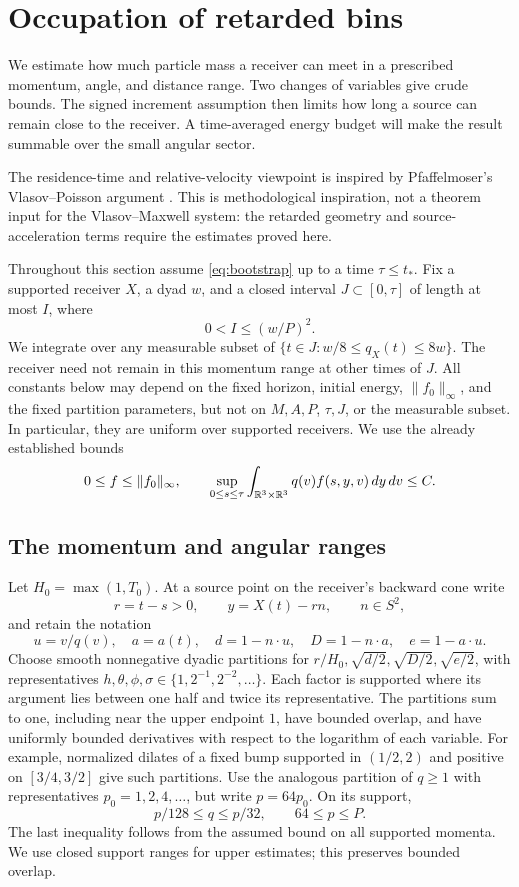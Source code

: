 \section{Occupation of retarded bins}\label{occ:section}

We estimate how much particle mass a receiver can meet in a prescribed
momentum, angle, and distance range. Two changes of variables give crude
bounds. The signed increment assumption then limits how long a source can
remain close to the receiver. A time-averaged energy budget will make the
result summable over the small angular sector.

The residence-time and relative-velocity viewpoint is inspired by
Pfaffelmoser's Vlasov--Poisson argument \cite{Pfaffelmoser1992}.
This is methodological inspiration, not a theorem input for the
Vlasov--Maxwell system: the retarded geometry and source-acceleration
terms require the estimates proved here.

Throughout this section assume \eqref{eq:bootstrap} up to a time
$\tau\leq t_*$. Fix a supported receiver $X$, a dyad $w$, and a closed
interval $J\subset[0,\tau]$ of length at most $I$, where
\begin{equation}\label{occ:interval}
 0<I\leq(w/P)^2.
\end{equation}
We integrate over any measurable subset of
$\{t\in J:w/8\leq q_X(t)\leq8w\}$. The receiver need not remain in
this momentum range at other times of $J$.
All constants below may depend on the fixed horizon, initial energy,
$\|f_0\|_\infty$, and the fixed partition parameters, but not on $M,A,P$,
$\tau,J$, or the measurable subset. In particular, they are uniform over
supported receivers. We use the already established bounds
\[
 0\leq f\leq\|f_0\|_\infty,
 \qquad \sup_{0\leq s\leq\tau}
  \int_{\mathbb R^3\times\mathbb R^3}q(v)f(s,y,v)\,dy\,dv\leq C.
\]

\subsection{The momentum and angular ranges}

Let $H_0=\max(1,T_0)$. At a source point on the receiver's backward cone
write
\[
 r=t-s>0,\qquad y=X(t)-rn,\qquad n\in S^2,
\]
and retain the notation
\[
 u=v/q(v),\quad a=a(t),\quad
 d=1-n\cdot u,\quad D=1-n\cdot a,\quad e=1-a\cdot u.
\]
Choose smooth nonnegative dyadic partitions for
$r/H_0,\sqrt{d/2},\sqrt{D/2},\sqrt{e/2}$, with representatives
$h,\theta,\phi,\sigma\in\{1,2^{-1},2^{-2},\ldots\}$.
Each factor is supported where its argument lies between one half and
twice its representative. The partitions sum to one, including near the
upper endpoint $1$, have bounded overlap, and have uniformly bounded derivatives
with respect to the logarithm of each variable. For example, normalized dilates of a fixed bump
supported in $(1/2,2)$ and positive on $[3/4,3/2]$ give such partitions.
Use the analogous partition of $q\geq1$ with representatives
$p_0=1,2,4,\ldots$, but write $p=64p_0$.
On its support,
\[
 p/128\leq q\leq p/32,\qquad 64\leq p\leq P.
\]
The last inequality follows from the assumed bound on all supported
momenta. We use closed support ranges for upper estimates; this preserves
bounded overlap.

